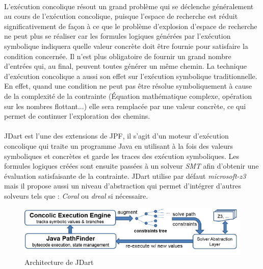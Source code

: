 			\paragraph{}
				L'exécution concolique résout un grand problème qui se déclenche généralement au cours de l'exécution concolique, %
				puisque l'espace de recherche est réduit significativement de façon à ce que le problème d'explosion d'espace de recherche
				ne peut plus se réaliser car les formules logiques générées par l'exécution symbolique indiquera quelle valeur concrète
				doit être fournie pour satisfaire la condition concernée.
				Il n'est plus obligatoire de fournir un grand nombre d'entrées qui, au final, peuvent toutes générer un même chemin.
				\newline
				La technique d'exécution concolique a aussi son effet sur l'exécution symbolique traditionnelle.
				En effet, quand une condition ne peut pas être résolue symboliquement à cause de la complexité de la contrainte (Équation mathématique complexe,
				opération sur les nombres flottant...) elle sera remplacée par une valeur concrète, ce qui permet de continuer l'exploration des chemins.

			\paragraph{}
				JDart est l'une des extensions de \gls{JPF}, il s'agit d'un moteur d'exécution concolique qui traite un programme Java
				en utilisant à la fois des valeurs symboliques et concrètes et garde les traces des exécution symboliques.
				Les formules logiques créées sont ensuite passées à un solveur \textit{\gls{SMT}} afin d'obtenir une évaluation satisfaisante de la contrainte.
				JDart utilise par défaut \textit{\gls{microsoft-z3}} mais  il propose aussi un niveau d'abstraction qui permet d'intégrer d'autres solveurs
				tels que : \textit{Coral} ou \textit{dreal} si nécessaire.
				
			\begin{figure}[H]
				\centering
					\includegraphics[scale=0.5]{images/archJDart.png}
				\caption{Architecture de JDart}
			\end{figure}
				
